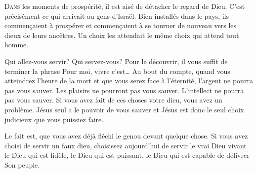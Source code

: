 





\lettrine{D}{ans} les moments de prospérité,
 il est aisé de détacher le regard de Dieu.
 C'est précisément ce qui arrivait au gens d'Israël.
 Bien installés dans le pays, ils commen\c{c}aient à prospérer
 \ocadr et commen\c{c}aient à se tourner de nouveau vers les dieux
 de leurs ancêtres.
 Un choix les attendait \ocadr le même choix qui attend tout homme.


Qui allez-vous servir? Qui servez-vous? Pour le découvrir,
 il vous suffit de terminer la phrase\frcolon{}
 \Og Pour moi, vivre c'est\dots{} \Fg{}
 Au bout du compte, quand vous atteindrez l'heure de la mort
 et que vous serez face à l'éternité, l'argent ne pourra pas vous sauver.
 Les plaisirs ne pourront pas vous sauver.
 L'intellect ne pourra pas vous sauver.
 Si vous avez fait de ces choses votre dieu, vous avez un problème.
 Jésus seul a le pouvoir de vous sauver
 et Jésus est donc le seul choix judicieux que vous puissiez faire.

Le fait est, que vous avez déjà fléchi le genou devant quelque chose.
 Si vous avez choisi de servir un faux dieu,
 choisissez aujourd'hui de servir le vrai Dieu vivant
 \ocadr le Dieu qui est fidèle, le Dieu qui est puissant,
 le Dieu qui est capable de délivrer Son peuple. 

\dvrule



